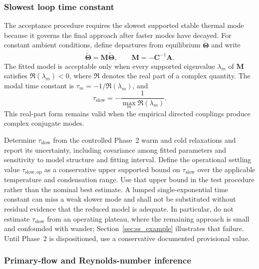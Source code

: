 \documentclass[11pt]{article}
\newcommand{\Realpart}[1]{\Re\left(#1\right)}
\begin{document}
\subsubsection{Slowest loop time constant}
\label{sec:tau_slow}

The acceptance procedure requires the slowest supported stable thermal mode because it governs the final approach after faster modes have decayed. For constant ambient conditions, define departures from equilibrium $\widetilde{\boldsymbol\Theta}$ and write
\begin{equation}
    \dot{\widetilde{\boldsymbol\Theta}}
    =
    \mathbf M\widetilde{\boldsymbol\Theta},
    \qquad
    \mathbf M=-\mathbf C^{-1}\mathbf A.
    \label{eq:state_matrix}
\end{equation}
The fitted model is acceptable only when every supported eigenvalue $\lambda_m$ of $\mathbf M$ satisfies $\Realpart{\lambda_m}<0$, where $\Re$ denotes the real part of a complex quantity. The modal time constant is $\tau_m=-1/\Realpart{\lambda_m}$, and
\begin{equation}
    \tau_{\mathrm{slow}}
    =
    -\frac{1}{\max_m\Realpart{\lambda_m}}.
    \label{eq:tau_slow}
\end{equation}
This real-part form remains valid when the empirical directed couplings produce complex conjugate modes.

Determine $\tau_{\mathrm{slow}}$ from the controlled Phase~2 warm and cold relaxations and report its uncertainty, including covariance among fitted parameters and sensitivity to model structure and fitting interval. Define the operational settling value $\tau_{\mathrm{slow,op}}$ as a conservative upper supported bound on $\tau_{\mathrm{slow}}$ over the applicable temperature and condensation range. Use that upper bound in the test procedure rather than the nominal best estimate. A lumped single-exponential time constant can miss a weak slower mode and shall not be substituted without residual evidence that the reduced model is adequate. In particular, do not estimate $\tau_{\mathrm{slow}}$ from an operating plateau, where the remaining approach is small and confounded with wander; Section~\ref{sec:ss_example} illustrates that failure. Until Phase~2 is dispositioned, use a conservative documented provisional value.

\subsubsection{Primary-flow and Reynolds-number inference}
\label{sec:flow_inference}
\end{document}
